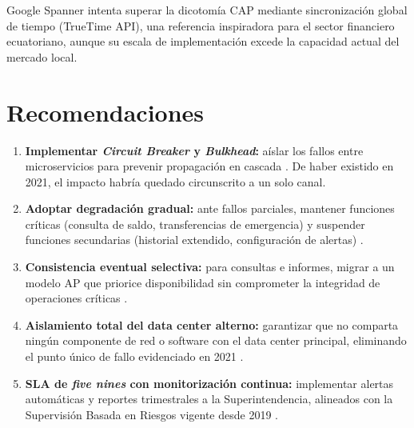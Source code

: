 \documentclass[12pt,a4paper]{article}
\begin{document}
Google Spanner intenta superar la dicotom\'ia CAP mediante sincronizaci\'on global de tiempo (TrueTime API), una referencia inspiradora para el sector financiero ecuatoriano, aunque su escala de implementaci\'on excede la capacidad actual del mercado local.

\section{Recomendaciones}

\begin{enumerate}[leftmargin=1.5cm, itemsep=4pt]

  \item \textbf{Implementar \textit{Circuit Breaker} y \textit{Bulkhead}:} a\'islar los fallos entre microservicios para prevenir propagaci\'on en cascada \cite{DesignPatterns2024}. De haber existido en 2021, el impacto habr\'ia quedado circunscrito a un solo canal.

  \item \textbf{Adoptar degradaci\'on gradual:} ante fallos parciales, mantener funciones cr\'iticas (consulta de saldo, transferencias de emergencia) y suspender funciones secundarias (historial extendido, configuraci\'on de alertas) \cite{Brewer2000}.

  \item \textbf{Consistencia eventual selectiva:} para consultas e informes, migrar a un modelo AP que priorice disponibilidad sin comprometer la integridad de operaciones cr\'iticas \cite{GilbertLynch2002}.

  \item \textbf{Aislamiento total del data center alterno:} garantizar que no comparta ning\'un componente de red o software con el data center principal, eliminando el punto \'unico de fallo evidenciado en 2021 \cite{KirtiFaultTolerance2024}.

  \item \textbf{SLA de \textit{five nines} con monitorizaci\'on continua:} implementar alertas autom\'aticas y reportes trimestrales a la Superintendencia, alineados con la Supervisi\'on Basada en Riesgos vigente desde 2019 \cite{SuperbancosIncidente2021}.

\end{enumerate}

\end{document}
